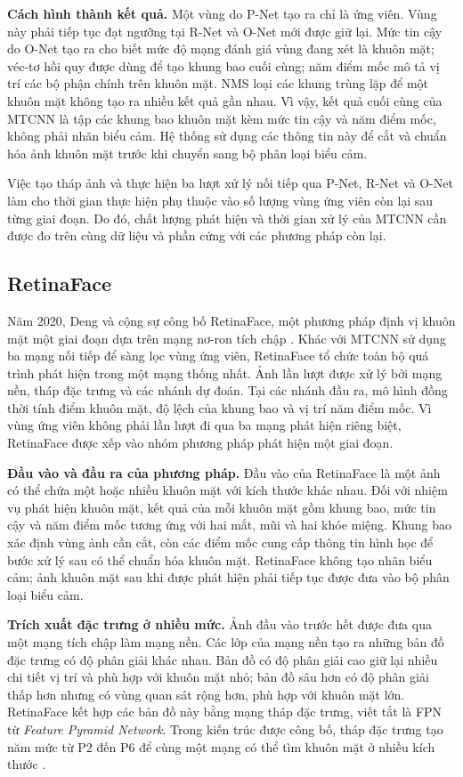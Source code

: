 \documentclass[../LuanVan.tex]{subfiles}
\begin{document}
\noindent\textbf{Cách hình thành kết quả.} Một vùng do P-Net tạo ra chỉ là ứng viên. Vùng này phải tiếp tục đạt ngưỡng tại R-Net và O-Net mới được giữ lại. Mức tin cậy do O-Net tạo ra cho biết mức độ mạng đánh giá vùng đang xét là khuôn mặt; véc-tơ hồi quy được dùng để tạo khung bao cuối cùng; năm điểm mốc mô tả vị trí các bộ phận chính trên khuôn mặt. NMS loại các khung trùng lặp để một khuôn mặt không tạo ra nhiều kết quả gần nhau. Vì vậy, kết quả cuối cùng của MTCNN là tập các khung bao khuôn mặt kèm mức tin cậy và năm điểm mốc, không phải nhãn biểu cảm. Hệ thống sử dụng các thông tin này để cắt và chuẩn hóa ảnh khuôn mặt trước khi chuyển sang bộ phân loại biểu cảm.

Việc tạo tháp ảnh và thực hiện ba lượt xử lý nối tiếp qua P-Net, R-Net và O-Net làm cho thời gian thực hiện phụ thuộc vào số lượng vùng ứng viên còn lại sau từng giai đoạn. Do đó, chất lượng phát hiện và thời gian xử lý của MTCNN cần được đo trên cùng dữ liệu và phần cứng với các phương pháp còn lại.

\subsection{RetinaFace}
\label{subsection:2.2.3}

Năm 2020, Deng và cộng sự công bố RetinaFace, một phương pháp định vị khuôn mặt một giai đoạn dựa trên mạng nơ-ron tích chập \cite{deng2020retinaface}. Khác với MTCNN sử dụng ba mạng nối tiếp để sàng lọc vùng ứng viên, RetinaFace tổ chức toàn bộ quá trình phát hiện trong một mạng thống nhất. Ảnh lần lượt được xử lý bởi mạng nền, tháp đặc trưng và các nhánh dự đoán. Tại các nhánh đầu ra, mô hình đồng thời tính điểm khuôn mặt, độ lệch của khung bao và vị trí năm điểm mốc. Vì vùng ứng viên không phải lần lượt đi qua ba mạng phát hiện riêng biệt, RetinaFace được xếp vào nhóm phương pháp phát hiện một giai đoạn.

\noindent\textbf{Đầu vào và đầu ra của phương pháp.} Đầu vào của RetinaFace là một ảnh có thể chứa một hoặc nhiều khuôn mặt với kích thước khác nhau. Đối với nhiệm vụ phát hiện khuôn mặt, kết quả của mỗi khuôn mặt gồm khung bao, mức tin cậy và năm điểm mốc tương ứng với hai mắt, mũi và hai khóe miệng. Khung bao xác định vùng ảnh cần cắt, còn các điểm mốc cung cấp thông tin hình học để bước xử lý sau có thể chuẩn hóa khuôn mặt. RetinaFace không tạo nhãn biểu cảm; ảnh khuôn mặt sau khi được phát hiện phải tiếp tục được đưa vào bộ phân loại biểu cảm.

\noindent\textbf{Trích xuất đặc trưng ở nhiều mức.} Ảnh đầu vào trước hết được đưa qua một mạng tích chập làm mạng nền. Các lớp của mạng nền tạo ra những bản đồ đặc trưng có độ phân giải khác nhau. Bản đồ có độ phân giải cao giữ lại nhiều chi tiết vị trí và phù hợp với khuôn mặt nhỏ; bản đồ sâu hơn có độ phân giải thấp hơn nhưng có vùng quan sát rộng hơn, phù hợp với khuôn mặt lớn. RetinaFace kết hợp các bản đồ này bằng mạng tháp đặc trưng, viết tắt là FPN từ \textit{Feature Pyramid Network}. Trong kiến trúc được công bố, tháp đặc trưng tạo năm mức từ P2 đến P6 để cùng một mạng có thể tìm khuôn mặt ở nhiều kích thước \cite{deng2020retinaface}.
\end{document}
